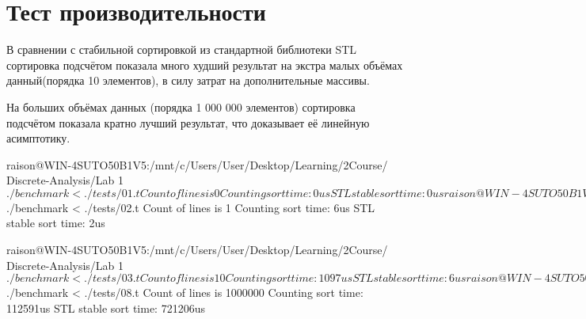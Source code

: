 \section{Тест производительности}
В сравнении с стабильной сортировкой из стандартной библиотеки STL сортировка подсчётом показала много худший результат на экстра малых объёмах данный(порядка 10 элементов), в силу затрат на дополнительные массивы.

На больших объёмах данных (порядка 1 000 000 элементов) сортировка подсчётом показала кратно лучший результат, что доказывает её линейную асимптотику.

\begin{verbatim*}
raison@WIN-4SUTO50B1V5:/mnt/c/Users/User/Desktop/Learning/2Course/
Discrete-Analysis/Lab 1$ ./benchmark < ./tests/01.t
Count of lines is 0
Counting sort time: 0us
STL stable sort time: 0us

raison@WIN-4SUTO50B1V5:/mnt/c/Users/User/Desktop/Learning/2Course/
Discrete-Analysis/Lab 1$ ./benchmark < ./tests/02.t
Count of lines is 1
Counting sort time: 6us
STL stable sort time: 2us

raison@WIN-4SUTO50B1V5:/mnt/c/Users/User/Desktop/Learning/2Course/
Discrete-Analysis/Lab 1$ ./benchmark < ./tests/03.t
Count of lines is 10
Counting sort time: 1097us
STL stable sort time: 6us

raison@WIN-4SUTO50B1V5:/mnt/c/Users/User/Desktop/Learning/2Course/
Discrete-Analysis/Lab 1$ ./benchmark < ./tests/08.t
Count of lines is 1000000
Counting sort time: 112591us
STL stable sort time: 721206us
\end{verbatim*}

\pagebreak

